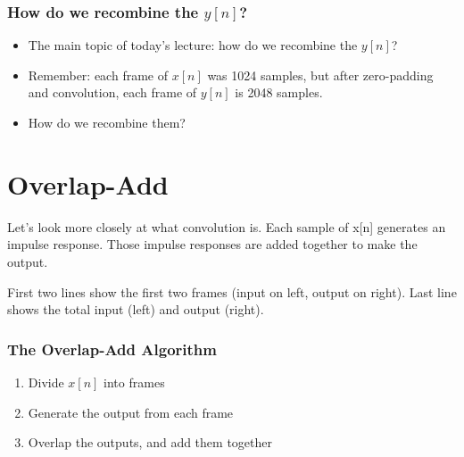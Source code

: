 \documentclass{beamer}
\begin{document}
\begin{frame}
  \frametitle{How do we recombine the $y[n]$?}

  \begin{itemize}
    \item 
      The main topic of today's lecture: how do we recombine the $y[n]$?
    \item
      Remember: each frame of $x[n]$ was 1024 samples, but after
      zero-padding and convolution, each frame of $y[n]$ is 2048 samples.
    \item
      How do we recombine them?
  \end{itemize}
\end{frame}

\section[Overlap-Add]{Overlap-Add}
\setcounter{subsection}{1}

\begin{frame}
  Let's look more closely at what convolution is.  Each sample of x[n]
  generates an impulse response.  Those impulse responses are added
  together to make the output.

  \centerline{}
\end{frame}

\begin{frame}
  First two lines show the first two frames (input on left, output on right).  Last line shows
  the total input (left) and output (right).

  \centerline{}
\end{frame}

\begin{frame}
  \frametitle{The Overlap-Add Algorithm}

  \begin{enumerate}
    \item Divide $x[n]$ into frames
    \item Generate the output from each frame
    \item  Overlap the outputs, and add them together
  \end{enumerate}
\end{frame}
\end{document}
